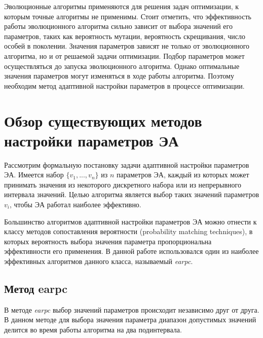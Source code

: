 Эволюционные алгоритмы применяются для решения задач оптимизации, к которым точные алгоритмы не применимы. Стоит отметить, что эффективность работы эволюционного алгоритма сильно зависит от выбора значений его параметров, таких как вероятность мутации, вероятность скрещивания, число особей в поколении. Значения параметров зависят не только от эволюционного алгоритма, но и от решаемой задачи оптимизации. Подбор параметров может осуществляться до запуска эволюционного алгоритма. Однако оптимальные значения параметров могут изменяться в ходе работы алгоритма. Поэтому необходим метод адаптивной настройки параметров в процессе оптимизации.

\section{Обзор существующих методов настройки параметров ЭА}

Рассмотрим формальную постановку задачи адаптивной настройки параметров ЭА. Имеется набор $\{v_1, ..., v_n\}$ из $n$ параметров ЭА, каждый из которых может принимать значения из некоторого дискретного набора или из непрерывного интервала значений. Целью алгоритма является выбор таких значений параметров $v_i$, чтобы ЭА работал наиболее эффективно.

Большинство алгоритмов адаптивной настройки параметров ЭА можно отнести к классу методов сопоставления  вероятности (probability matching techniques), в которых вероятность выбора значения параметра пропорциональна эффективности его применения. В данной работе использовался один из наиболее эффективных алгоритмов данного класса, называемый \textit{earpc}.

\subsection{Метод earpc}
\label{earpc}
В методе \textit{earpc} выбор значений параметров происходит независимо друг от друга. В данном методе для выбора значения параметра диапазон допустимых значений делится во время работы алгоритма на два подинтервала.

